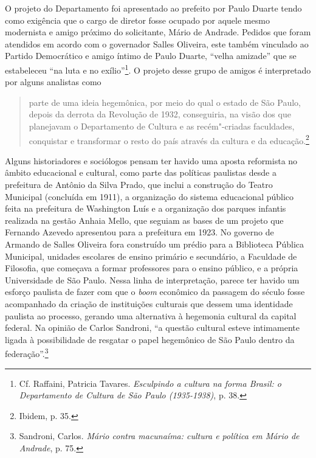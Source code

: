 O projeto do Departamento foi apresentado ao prefeito por Paulo Duarte
tendo como exigência que o cargo de diretor fosse ocupado por aquele
mesmo modernista e amigo próximo do solicitante, Mário de Andrade.
Pedidos que foram atendidos em acordo com o governador Salles Oliveira,
este também vinculado ao Partido Democrático e amigo íntimo de Paulo
Duarte, ``velha amizade'' que se estabeleceu ``na luta e no
exílio''\footnote{Cf. Raffaini, Patricia Tavares. \emph{Esculpindo a
  cultura na forma Brasil: o Departamento de Cultura de São Paulo
  (1935-1938)}, p. 38.}. O projeto desse grupo de amigos é interpretado
por alguns analistas como

\begin{quote}
parte de uma ideia hegemônica, por meio do qual o estado de São Paulo,
depois da derrota da Revolução de 1932, conseguiria, na visão dos que
planejavam o Departamento de Cultura e as recém"-criadas faculdades,
conquistar e transformar o resto do país através da cultura e da
educação.\footnote{Ibidem, p. 35.}
\end{quote}

Alguns historiadores e sociólogos pensam ter havido uma aposta
reformista no âmbito educacional e cultural, como parte das políticas
paulistas desde a prefeitura de Antônio da Silva Prado, que inclui a
construção do Teatro Municipal (concluída em 1911), a organização do
sistema educacional público feita na prefeitura de Washington Luís e a
organização dos parques infantis realizada na gestão Anhaia Mello, que
seguiam as bases de um projeto que Fernando Azevedo apresentou para a
prefeitura em 1923. No governo de Armando de Salles Oliveira fora
construído um prédio para a Biblioteca Pública Municipal, unidades
escolares de ensino primário e secundário, a Faculdade de Filosofia, que
começava a formar professores para o ensino público, e a própria
Universidade de São Paulo. Nessa linha de interpretação, parece ter
havido um esforço paulista de fazer com que o \emph{boom} econômico da
passagem do século fosse acompanhado da criação de instituições
culturais que dessem uma identidade paulista ao processo, gerando uma
alternativa à hegemonia cultural da capital federal. Na opinião de
Carlos Sandroni, ``a questão cultural esteve intimamente ligada à
possibilidade de resgatar o papel hegemônico de São Paulo dentro da
federação''.\footnote{Sandroni, Carlos. \emph{Mário contra macunaíma:
  cultura e política em Mário de Andrade}, p. 75.}

